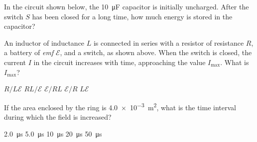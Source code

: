 \documentclass[12pt]{../../oss-apphys-exam}
\begin{document}
\begin{questions}
  \question In the circuit shown below, the \SI{10}{\micro\farad} capacitor is
  initially uncharged. After the switch $S$ has been closed for a long time,
  how much energy is stored in the capacitor?
  \newpage

  \question An inductor of inductance $L$ is connected in series with a
  resistor of resistance $R$, a battery of \emph{emf} $\mathcal E$, and a
  switch, as shown above. When the switch is closed, the current $I$ in the
  circuit increases with time, approaching the value $I_\text{max}$. What is
  $I_\text{max}$?
  \begin{choices}
    \choice $R/L\mathcal E$
    \choice $RL/\mathcal E$
    \choice $\mathcal E/RL$
    \choice $\mathcal E/R$
    \choice $L\mathcal E$
  \end{choices}
  \newpage
  
  
  \question If the area enclosed by the ring is \SI{4.0e-3}{\metre\squared},
  what is the time interval during which the field is increased?
  \begin{choices}
    \choice \SI{2.0}{\micro\second}
    \choice \SI{5.0}{\micro\second}
    \choice \SI{10}{\micro\second}
    \choice \SI{20}{\micro\second}
    \choice \SI{50}{\micro\second}
  \end{choices}
  \label{emf1}


\end{questions}
\end{document}
